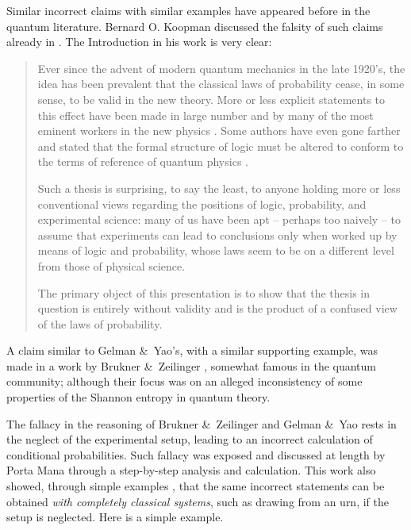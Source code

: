 \documentclass[\ifafour a4paper,12pt,\else a5paper,10pt,\fi%
onecolumn,oneside,article,%
british%
]{memoir}
\theoremstyle{remark}
\theoremstyle{innote}
\newcommand*{\citey}{\parencites*}
\newcommand*{\amp}{\&}
\renewcommand*{\|}[1][]{\nonscript\,#1\vert\nonscript\;\mathopen{}}
\newcommand*{\sect}{\S}%
\begin{document}
Similar incorrect claims with similar examples have appeared before in the
quantum literature. Bernard O. Koopman \parencite[of the Pitman-Koopman
theorem for sufficient statistics,][]{koopman1936} discussed the
falsity of such claims already in \cite*{koopman1957}. The Introduction in
his work is very clear:
\begin{quotation}\footnotesize
  Ever since the advent of modern quantum mechanics in the late
  1920's, the idea has been prevalent that the classical laws of
  probability cease, in some sense, to be valid in the new theory. More or
  less explicit statements to this effect have been made in large number
  and by many of the most eminent workers in the new physics \textelp{}.
  Some authors have even gone farther and stated that the formal structure
  of logic must be altered to conform to the terms of reference of quantum
  physics \textelp{}.

  Such a thesis is surprising, to say the least, to anyone holding more or
  less conventional views regarding the positions of logic, probability,
  and experimental science: many of us have been apt -- perhaps too naively
  -- to assume that experiments can lead to conclusions only when worked up
  by means of logic and probability, whose laws seem to be on a different
  level from those of physical science.

  The primary object of this presentation is to show that the thesis in
  question is entirely without validity and is the product of a confused
  view of the laws of probability.
\end{quotation}

A claim similar to Gelman \amp\ Yao's, with a similar supporting example,
was made in a work by Brukner \amp\ Zeilinger \citey{brukneretal2001},
somewhat famous in the quantum community; although their focus was on an
alleged inconsistency of some properties of the Shannon entropy in quantum
theory.

The fallacy in the reasoning of Brukner \amp\ Zeilinger and Gelman \amp\
Yao rests in the neglect of the experimental setup, leading to an incorrect
calculation of conditional probabilities. Such fallacy was exposed and
discussed at length by Porta Mana \citey{portamana2003_r2004} through a
step-by-step analysis and calculation. This work also showed, through
simple examples \parencite[\sect~IV]{portamana2003_r2004}, that the same
incorrect statements can be obtained \emph{with completely classical
  systems}, such as drawing from an urn, if the setup is neglected. Here is
a simple example.
\end{document}
